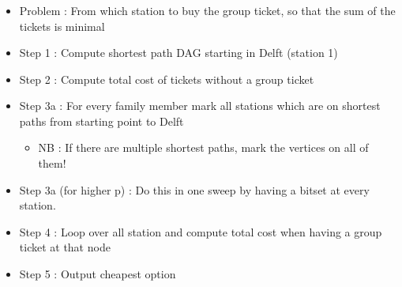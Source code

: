 \begin{frame}
	\frametitle{\problemtitle}
    \begin{itemize}
		\item Problem : From which station to buy the group ticket, so that the sum of the tickets is minimal 
    \item Step 1 : Compute shortest path DAG starting in Delft (station 1)
    \item Step 2 : Compute total cost of tickets without a group ticket
    \item Step 3a : For every family member mark all stations which are on shortest paths from starting point to Delft 
      \begin{itemize}
        \item NB : If there are multiple shortest paths, mark the vertices on all of them!
      \end{itemize}
    \item Step 3a (for higher p) : Do this in one sweep by having a bitset at every station.
    \item Step 4 : Loop over all station and compute total cost when having a group ticket at that node
    \item Step 5 : Output cheapest option
    \end{itemize}
\end{frame}
